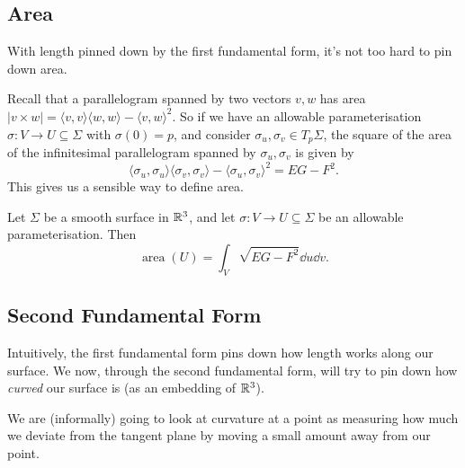 \documentclass[a4paper, 10pt, twocolumn]{amsart}
\begin{document}
\subsection{Area}

With length pinned down by the first fundamental form, it's not too hard to pin down area. 

Recall that a parallelogram spanned by two vectors $v, w$ has area $|v \times w| = \langle v, v \rangle \langle w, w \rangle - \langle v, w \rangle^2$. So if we have an allowable parameterisation $\sigma: V \rightarrow U \subseteq \Sigma$ with $\sigma(0) = p$, and consider $\sigma_u, \sigma_v \in T_p \Sigma$, the square of the area of the infinitesimal parallelogram spanned by $\sigma_u, \sigma_v$ is given by
$$
\langle \sigma_u, \sigma_u \rangle \langle \sigma_v, \sigma_v \rangle - \langle \sigma_u, \sigma_v \rangle^2 = EG - F^2.
$$
This gives us a sensible way to define area.

\begin{definition}[Area]
    Let $\Sigma$ be a smooth surface in $\mathbb{R}^3$, and let $\sigma: V \rightarrow U \subseteq \Sigma$ be an allowable parameterisation. Then
    $$
\operatorname{area}(U) = \int_V \sqrt{EG - F^2} \dd u \dd v.
    $$
\end{definition}

\subsection{Second Fundamental Form}


Intuitively, the first fundamental form pins down how length works along our surface. We now, through the second fundamental form, will try to pin down how \emph{curved} our surface is (as an embedding of $\mathbb{R}^3$).

We are (informally) going to look at curvature at a point as measuring how much we deviate from the tangent plane by moving a small amount away from our point.
\end{document}
